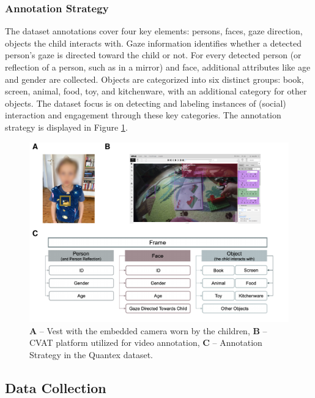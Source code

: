 \documentclass[
  man,floatsintext]{apa6}
\begin{document}
\subsubsection{Annotation Strategy}\label{annotation-strategy}

The dataset annotations cover four key elements: persons, faces, gaze direction, objects the child interacts with. Gaze information identifies whether a detected person's gaze is directed toward the child or not. For every detected person (or reflection of a person, such as in a mirror) and face, additional attributes like age and gender are collected. Objects are categorized into six distinct groups: book, screen, animal, food, toy, and kitchenware, with an additional category for other objects. The dataset focus is on detecting and labeling instances of (social) interaction and engagement through these key categories. The annotation strategy is displayed in Figure \ref{fig:camera-cvat-activity-classes}.

\begin{figure}

{\centering \includegraphics{Quantex_interaction_paper_files/figure-latex/camera-cvat-activity-classes-1} 

}

\caption{\textbf{A} – Vest with the embedded camera worn by the children, \textbf{B} – CVAT platform utilized for video annotation, \textbf{C} – Annotation Strategy in the Quantex dataset.}\label{fig:camera-cvat-activity-classes}
\end{figure}

\subsection{Data Collection}\label{data-collection}
\end{document}
